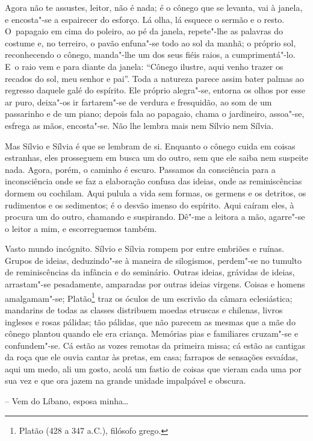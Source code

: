 Agora não te assustes, leitor, não é nada; é o cônego que se levanta,
vai à janela, e encosta"-se a espairecer do esforço. Lá olha, lá esquece
o sermão e o resto. O~papagaio em cima do poleiro, ao pé da janela,
repete"-lhe as palavras do costume e, no terreiro, o pavão enfuna"-se todo
ao sol da manhã; o próprio sol, reconhecendo o cônego, manda"-lhe um dos
seus fiéis raios, a cumprimentá"-lo. E~o raio vem e para diante da
janela: ``Cônego ilustre, aqui venho trazer os recados do sol, meu
senhor e pai''. Toda a natureza parece assim bater palmas ao regresso
daquele galé do espírito. Ele próprio alegra"-se, entorna os olhos por
esse ar puro, deixa"-os ir fartarem"-se de verdura e fresquidão, ao som de
um passarinho e de um piano; depois fala ao papagaio, chama o
jardineiro, assoa"-se, esfrega as mãos, encosta"-se. Não lhe lembra mais
nem Sílvio nem Sílvia.

Mas Sílvio e Sílvia é que se lembram de si. Enquanto o cônego cuida em
coisas estranhas, eles prosseguem em busca um do outro, sem que ele
saiba nem suspeite nada. Agora, porém, o caminho é escuro. Passamos da
consciência para a inconsciência onde se faz a elaboração confusa das
ideias, onde as reminiscências dormem ou cochilam. Aqui pulula a vida
sem formas, os germens e os detritos, os rudimentos e os sedimentos; é o
desvão imenso do espírito. Aqui caíram eles, à procura um do outro,
chamando e suspirando. Dê"-me a leitora a mão, agarre"-se o leitor a mim,
e escorreguemos também.

Vasto mundo incógnito. Sílvio e Sílvia rompem por entre embriões e
ruínas. Grupos de ideias, deduzindo"-se à maneira de silogismos,
perdem"-se no tumulto de reminiscências da infância e do seminário.
Outras ideias, grávidas de ideias, arrastam"-se pesadamente, amparadas
por outras ideias virgens. Coisas e homens amalgamam"-se;
Platão\footnote{Platão (428 a 347 a.C.), filósofo grego.} traz os óculos
de um escrivão da câmara eclesiástica; mandarins de todas as classes
distribuem moedas etruscas e chilenas, livros ingleses e rosas pálidas;
tão pálidas, que não parecem as mesmas que a mãe do cônego plantou
quando ele era criança. Memórias pias e familiares cruzam"-se e
confundem"-se. Cá estão as vozes remotas da primeira missa; cá estão as
cantigas da roça que ele ouvia cantar às pretas, em casa; farrapos de
sensações esvaídas, aqui um medo, ali um gosto, acolá um fastio de
coisas que vieram cada uma por sua vez e que ora jazem na grande unidade
impalpável e obscura.

-- Vem do Líbano, esposa minha\ldots{}

